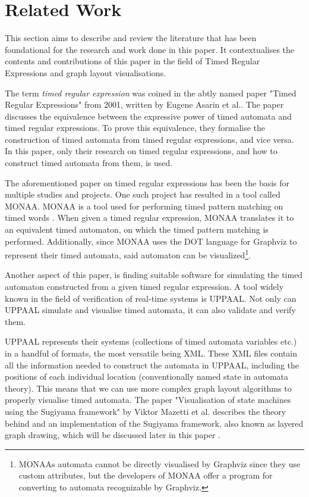 \section{Related Work}



This section aims to describe and review the literature that has been foundational for the research and work done in this paper. It contextualises the contents and contributions of this paper in the field of Timed Regular Expressions and graph layout visualisations.

The term \textit{timed regular expression} was coined in the abtly named paper "Timed Regular Expressions" from 2001, written by Eugene Asarin et al.\cite{Eugene2001}. The paper discusses the equivalence between the expressive power of timed automata\cite{ALUR1994} and timed regular expressions. To prove this equivalence, they formalise the construction of timed automata from timed regular expressions, and vice versa. In this paper, only their research on timed regular expressions, and how to construct timed automata from them, is used.

The aforementioned paper on timed regular expressions has been the basis for multiple studies and projects. One such project has resulted in a tool called MONAA. MONAA is a tool used for performing timed pattern matching on timed words \cite{MONAA2017}. When given a timed regular expression, MONAA translates it to an equivalent timed automaton, on which the timed pattern matching is performed. Additionally, since MONAA uses the DOT language for Graphviz \cite{Graphviz} to represent their timed automata, said automaton can be visualized\footnote{MONAAs automata cannot be directly visualised by Graphviz since they use custom attributes, but the developers of MONAA offer a program for converting to automata recognizable by Graphviz\cite{MONAA2017}.}.

Another aspect of this paper, is finding suitable software for simulating the timed automaton constructed from a given timed regular expression. A tool widely known in the field of verification of real-time systems is UPPAAL. Not only can UPPAAL simulate and visualise timed automata, it can also validate and verify them\cite{UPPAAL}.

UPPAAL represents their systems (collections of timed automata variables etc.) in a handful of formats, the most versatile being XML\cite{UPPAAL}. These XML files contain all the information needed to construct the automata in UPPAAL, including the positions of each individual location (conventionally named state in automata theory). This means that we can use more complex graph layout algorithms to properly visualise timed automata. The paper "Visualisation of state machines using the Sugiyama framework" by Viktor Mazetti et al. describes the theory behind and an implementation of the Sugiyama framework, also known as layered graph drawing, which will be discussed later in this paper \cite{Mazetti2012}.